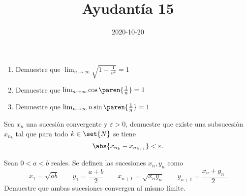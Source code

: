\documentclass{ayudantia}
\title{Ayudantía 15}
\date{2020-10-20}
\begin{document}
\maketitle


\begin{prob}
    \begin{enumerate}[label=(\alph*)]
        \item Demuestre que \(\lim_{n\rightarrow\infty}\sqrt{1-\frac1{n^2}}=1\)
        \item Demuestre que \(\lim_{n\rightarrow\infty}\cos\paren{\frac1n}=1\)
        \item Demuestre que \(\lim_{n\rightarrow\infty}n\sin\paren{\frac1n}=1\)
    \end{enumerate}
\end{prob}

\begin{ans}
    \begin{sol}

    \end{sol}
\end{ans}



\begin{prob}
    Sea \(x_n\) una sucesión convergente y \(\varepsilon>0\), demuestre que existe una subsucesión \(x_{n_k}\) tal que para todo \(k\in\set{N}\) se tiene
    \begin{equation*}
        \abs{x_{n_k}-x_{n_{k+1}}}<\varepsilon.
    \end{equation*}
\end{prob}

\begin{ans}
    \begin{sol}

    \end{sol}
\end{ans}


\begin{prob}
    Sean \(0<a<b\) reales. Se definen las sucesiones \(x_n,y_n\) como
    \begin{equation*}
        x_1=\sqrt{ab}\qquad y_1=\frac{a+b}2\qquad x_{n+1}=\sqrt{x_ny_n}\qquad y_{n+1}=\frac{x_n+y_n}2.
    \end{equation*}
    Demuestre que ambas sucesiones convergen al mismo límite.
\end{prob}

\begin{ans}
    \begin{sol}

    \end{sol}
\end{ans}
\end{document}
